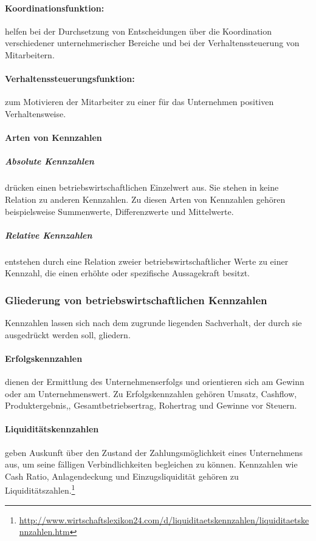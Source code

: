 \paragraph{Koordinationsfunktion:} helfen bei der Durchsetzung von Entscheidungen über die Koordination verschiedener unternehmerischer Bereiche und bei der Verhaltenssteuerung von Mitarbeitern.
\paragraph{Verhaltenssteuerungsfunktion:} zum Motivieren der Mitarbeiter zu einer für das Unternehmen positiven Verhaltensweise.


\paragraph{Arten von Kennzahlen}
\subparagraph{Absolute Kennzahlen} drücken einen betriebswirtschaftlichen Einzelwert aus. Sie stehen in keine Relation zu anderen Kennzahlen. Zu diesen Arten von Kennzahlen gehören beispielsweise Summenwerte, Differenzwerte und Mittelwerte.
\subparagraph{Relative Kennzahlen} entstehen durch eine Relation zweier betriebswirtschaftlicher Werte zu einer Kennzahl, die einen erhöhte oder spezifische Aussagekraft besitzt.

\subsubsection{Gliederung von betriebswirtschaftlichen Kennzahlen}
Kennzahlen lassen sich nach dem zugrunde liegenden Sachverhalt, der durch sie ausgedrückt werden soll, gliedern.

\paragraph{Erfolgskennzahlen} dienen der Ermittlung des Unternehmenserfolgs und orientieren sich am Gewinn oder am Unternehmenswert. Zu Erfolgskennzahlen gehören Umsatz, Cashflow, Produktergebnis,, Gesamtbetriebsertrag, Rohertrag und Gewinne vor Steuern.

\paragraph{Liquiditätskennzahlen} geben Auskunft über den Zustand der Zahlungs\-möglichkeit eines Unternehmens aus, um seine fälligen Verbindlichkeiten begleichen zu können. Kennzahlen wie Cash Ratio, Anlagendeckung und Einzugsliquidität gehören zu Liquiditätszahlen.\footnote{\url{http://www.wirtschaftslexikon24.com/d/liquiditaetskennzahlen/liquiditaetskennzahlen.htm}}


